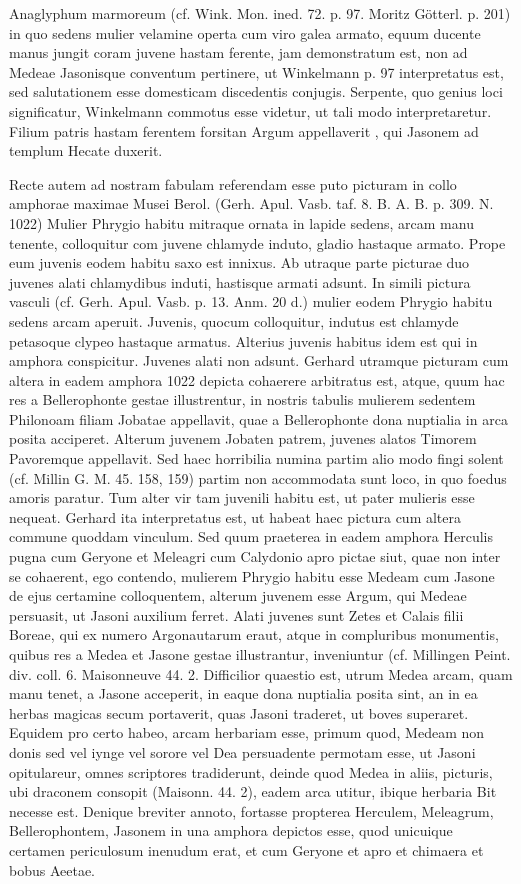 \documentclass[landscape, a4paper, 11pt, oneside, polutonikogreek, german]{article}
\begin{document}
Anaglyphum marmoreum (cf. Wink. Mon. ined. 72. p. 97. Moritz Götterl. p. 201) in quo sedens mulier velamine operta cum viro galea armato, equum ducente manus jungit coram juvene hastam ferente, jam demonstratum est, non ad Medeae Jasonisque conventum pertinere, ut Winkelmann p. 97 interpretatus est, sed salutationem esse domesticam discedentis conjugis. Serpente, quo genius loci significatur, Winkelmann commotus esse videtur, ut tali modo interpretaretur. Filium patris hastam ferentem forsitan Argum appellaverit , qui Jasonem ad templum Hecate duxerit.

Recte autem ad nostram fabulam referendam esse puto picturam in collo amphorae maximae Musei Berol. (Gerh. Apul. Vasb. taf. 8. B. A. B. p. 309. N. 1022) Mulier Phrygio habitu mitraque ornata in lapide sedens, arcam manu tenente, colloquitur com juvene chlamyde induto, gladio hastaque armato. Prope eum juvenis eodem habitu saxo est innixus. Ab utraque parte picturae duo juvenes alati chlamydibus induti, hastisque armati adsunt. In simili pictura vasculi (cf. Gerh. Apul. Vasb. p. 13. Anm. 20 d.) mulier eodem Phrygio habitu sedens arcam aperuit. Juvenis, quocum colloquitur, indutus est chlamyde petasoque clypeo hastaque armatus. Alterius juvenis habitus idem est qui in amphora conspicitur. Juvenes alati non adsunt. Gerhard utramque picturam cum altera in eadem amphora 1022 depicta cohaerere arbitratus est, atque, quum hac res a Bellerophonte gestae illustrentur, in nostris tabulis mulierem sedentem Philonoam filiam Jobatae appellavit, quae a Bellerophonte dona nuptialia in arca posita acciperet. Alterum juvenem Jobaten patrem, juvenes alatos Timorem Pavoremque appellavit. Sed haec horribilia numina partim alio modo fingi solent (cf. Millin G. M. 45. 158, 159) partim non accommodata sunt loco, in quo foedus amoris paratur. Tum alter vir tam juvenili habitu est, ut pater mulieris esse nequeat. Gerhard ita interpretatus est, ut habeat haec pictura cum altera commune quoddam vinculum. Sed quum praeterea in eadem amphora Herculis pugna cum Geryone et Meleagri cum Calydonio apro pictae siut, quae non inter se cohaerent, ego contendo, mulierem Phrygio habitu esse Medeam cum Jasone de ejus certamine colloquentem, alterum juvenem esse Argum, qui Medeae persuasit, ut Jasoni auxilium ferret. Alati juvenes sunt Zetes et Calais filii Boreae, qui ex numero Argonautarum eraut, atque in compluribus monumentis, quibus res a Medea et Jasone gestae illustrantur, inveniuntur (cf. Millingen Peint. div. coll. 6. Maisonneuve 44. 2. Difficilior quaestio est, utrum Medea arcam, quam manu tenet, a Jasone acceperit, in eaque dona nuptialia posita sint, an in ea herbas magicas secum portaverit, quas Jasoni traderet, ut boves superaret. Equidem pro certo habeo, arcam herbariam esse, primum quod, Medeam non donis sed vel iynge vel sorore vel Dea persuadente permotam esse, ut Jasoni opitulareur, omnes scriptores tradiderunt, deinde quod Medea in aliis, picturis, ubi draconem consopit (Maisonn. 44. 2), eadem arca utitur, ibique herbaria Bit necesse est. Denique breviter annoto, fortasse propterea Herculem, Meleagrum, Bellerophontem, Jasonem in una amphora depictos esse, quod unicuique certamen periculosum inenudum erat, et cum Geryone et apro et chimaera et bobus Aeetae.
\end{document}
